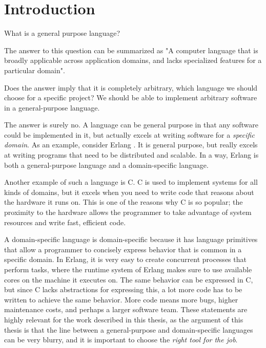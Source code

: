 \chapter{Introduction}
\label{chap:introduction}


\begin{LaTeXdescription}
    \item What is a general purpose language?
\end{LaTeXdescription}

The answer to this question can be summarized as "A computer language that is broadly applicable across application
domains, and lacks specialized features for a particular domain".

Does the answer imply that it is completely arbitrary, which language we should choose for a specific project? We should be
able to implement arbitrary software in a general-purpose language.

The answer is surely no. A language can be general purpose in that any software could be implemented in it, but
actually excels at writing software for a \textit{specific domain}. As an example, consider Erlang \cite{DBLP:conf/hopl/Armstrong07}. It is general purpose,
but really excels at writing programs that need to be distributed and scalable. In a way, Erlang is both a general-purpose
language and a domain-specific language.

Another example of such a language is C. C is used to implement systems for all kinds of domains, but it excels when you
need to write code that reasons about the hardware it runs on. This is one of the reasons why C is so popular; the proximity
to the hardware allows the programmer to take advantage of system resources and write fast, efficient code.

A domain-specific language \cite{DBLP:journals/csur/Hudak96} is domain-specific because it has language primitives that allow a programmer to concisely
express behavior that is common in a specific domain. In Erlang, it is very easy to create concurrent processes that perform
tasks, where the runtime system of Erlang makes sure to use available cores on the machine it executes on. The same behavior
can be expressed in C, but since C lacks abstractions for expressing this, a lot more code has to be written to achieve the
same behavior. More code means more bugs, higher maintenance costs, and perhaps a larger software team. These statements are
highly relevant for the work described in this thesis, as the argument of this thesis is that the line between a general-purpose
and domain-specific languages can be very blurry, and it is important to choose the \textit{right tool for the job}.

